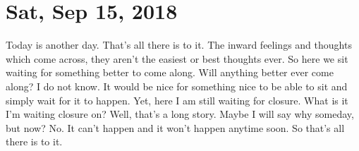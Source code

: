 \section{Sat, Sep 15, 2018}

Today is another day. That's all there is to it. The inward feelings and thoughts
which come across, they aren't the easiest or best thoughts ever. So here we sit
waiting for something better to come along. Will anything better ever come along? I
do not know. It would be nice for something nice to be able to sit and simply wait
for it to happen. Yet, here I am still waiting for closure. What is it I'm waiting
closure on? Well, that's a long story. Maybe I will say why someday, but now? No. It
can't happen and it won't happen anytime soon. So that's all there is to it.